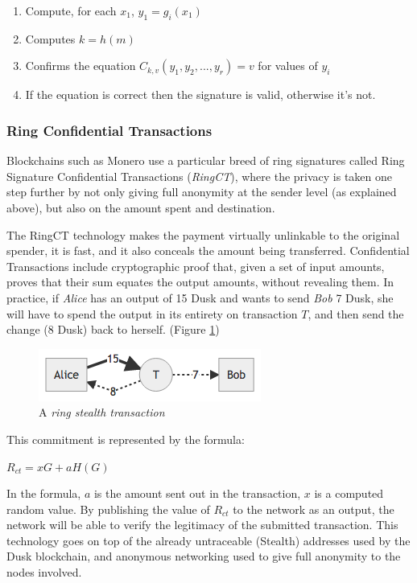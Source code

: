 \begin{enumerate}
\item Compute, for each $x_1$, $y_1=g_i(x_1)$
\item Computes $k=h(m)$
\item Confirms the equation $C_{k,v}(y_1,y_2, ..., y_r)=v$ for values of $y_i$
\item If the equation is correct then the signature is valid, otherwise it's not.
\end{enumerate}

\subsubsection{Ring Confidential Transactions}

Blockchains such as Monero use a particular breed of ring signatures called Ring Signature Confidential Transactions (\textit{RingCT}), where the privacy is taken one step further by not only giving full anonymity at the sender level (as explained above), but also on the amount spent and destination.

The RingCT technology makes the payment virtually unlinkable to the original spender, it is fast, and it also  conceals the amount being transferred. Confidential Transactions include cryptographic proof that, given a set of input amounts, proves that their sum equates the output amounts, without revealing them. In practice, if \textit{Alice} has an output of 15 \textrm{Dusk} and wants to send \textit{Bob} 7 \textrm{Dusk}, she will have to spend the output in its entirety on transaction $T$, and then send the change (8 \textrm{Dusk}) back to herself. (Figure \ref{fig:ringtx})

\begin{figure}
\includegraphics[scale=0.7]{ringtx}
\caption{A \textit{ring stealth transaction}}
\label{fig:ringtx}
\end{figure}

This commitment is represented by the formula: 

$R_{ct}=xG + aH(G)$

In the formula, $a$ is the amount sent out in the transaction, $x$ is a computed random value. By publishing the value of $R_{ct}$ to the network as an output, the network will be able to verify the legitimacy of the submitted transaction. This technology goes on top of the already untraceable (Stealth) addresses used by the \textrm{Dusk} blockchain, and anonymous networking used to give full anonymity to the nodes involved.

